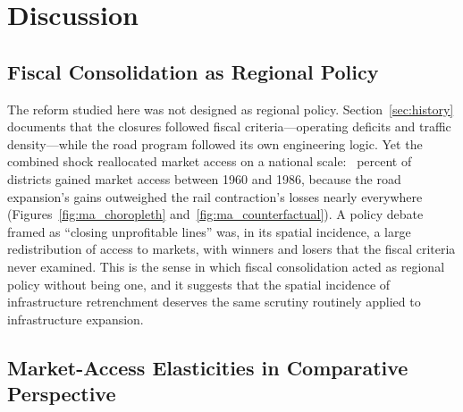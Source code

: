 %
%
%
%

\section{Discussion}
\label{sec:discussion}

\subsection{Fiscal Consolidation as Regional Policy}
\label{sec:fiscal_policy}

The reform studied here was not designed as regional policy.
Section~\ref{sec:history}
documents that the closures followed fiscal criteria---operating
deficits and traffic density---while the road program followed its own
engineering logic. Yet the combined shock reallocated market access on
a national scale: \maSharePos{}~percent of districts gained market access between
1960 and 1986, because the road expansion's gains outweighed the rail
contraction's losses nearly everywhere
(Figures~\ref{fig:ma_choropleth} and~\ref{fig:ma_counterfactual}). A
policy debate framed as ``closing
unprofitable lines'' was, in its spatial incidence, a large
redistribution of access to markets, with winners and losers that the
fiscal criteria never examined. This is the sense in which fiscal
consolidation acted as regional policy without being one, and it
suggests that the spatial incidence of infrastructure retrenchment
deserves the same scrutiny routinely applied to infrastructure
expansion.

\subsection{Market-Access Elasticities in Comparative Perspective}
\label{sec:comparative}

